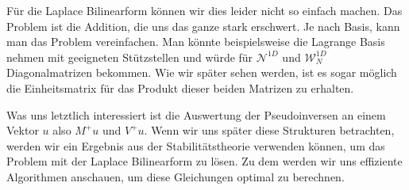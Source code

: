 Für die Laplace Bilinearform können wir dies leider nicht so einfach machen. Das Problem ist die Addition, die uns das ganze stark erschwert. Je nach Basis, kann man das Problem vereinfachen. Man könnte beispielsweise die Lagrange Basis nehmen mit geeigneten Stützstellen und würde für $\mathcal{N}^{1D}$ und $\mathcal{W}_N^{1D}$ Diagonalmatrizen bekommen. Wie wir später sehen werden, ist es sogar möglich die Einheitsmatrix für das Produkt dieser beiden Matrizen zu erhalten.

Was uns letztlich interessiert ist die Auswertung der Pseudoinversen an einem Vektor $u$ also $M^+ u$ und $V^+ u$. Wenn wir uns später diese Strukturen betrachten, werden wir ein Ergebnis aus der Stabilitätstheorie verwenden können, um das Problem mit der Laplace Bilinearform zu lösen. Zu dem werden wir uns effiziente Algorithmen anschauen, um diese Gleichungen optimal zu berechnen.


